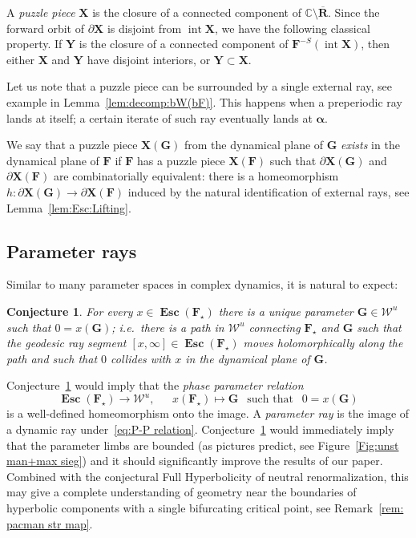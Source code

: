 \documentclass{amsart}
\renewcommand{\sp}{{\ \ }}
\newcommand{\1}{{\mathbb 1 }}
\newcommand\intr{\operatorname{int}}
\newcommand{\bF}{{\mathbf F}}
\newcommand{\bX}{{\mathbf X}}
\newcommand{\bY}{{\mathbf Y}}
\newcommand{\bR}{{\mathbf R}}
\newcommand{\bG}{{\mathbf G}}
\newcommand{\str}{{\star}}
\newcommand\Unst{{\boldsymbol{\mathcal{W}}^u}}
\newcommand{\C}{\mathbb{C}}
\newtheorem{conj}[thm]{Conjecture}
\theoremstyle{remark}
\numberwithin{equation}{section}
\theoremstyle{definition}
\newcommand{\Esc}{{\boldsymbol{\operatorname{Esc}}}}
\newcommand{\balpha}{{\boldsymbol \alpha}}
\theoremstyle{nonumberbreak}
\begin{document}
A \emph{puzzle piece} $\bX$ is the closure of a connected component of $\C\setminus \overline \bR$. Since the forward orbit of $\partial \bX$ is disjoint from $\intr \bX$, we have the following classical property. If $\bY$ is the closure of a connected component of $\bF^{-S}(\intr \bX)$, then either $\bX$ and $\bY$ have disjoint interiors, or $\bY\subset \bX$. 


Let us note that a puzzle piece can be surrounded by a single external ray, see example in Lemma~\ref{lem:decomp:bW(bF)}. This happens when a preperiodic ray lands at itself; a certain iterate of such ray eventually lands at $\balpha$.

We say that a puzzle piece $\bX(\bG)$ from the dynamical plane of $\bG$ \emph{exists} in the dynamical plane of $\bF$ if  $\bF$ has a puzzle piece $\bX(\bF)$ such that $\partial \bX(\bG)$ and $\partial \bX(\bF)$ are combinatorially equivalent: there is a homeomorphism $h\colon \partial \bX(\bG)\to \partial \bX(\bF)$ induced by the natural identification of external rays, see Lemma~\ref{lem:Esc:Lifting}.

\subsection{Parameter rays} \label{ss:param rays}Similar to many parameter spaces in complex dynamics, it is natural to expect:
\begin{conj}
\label{conj:P-P relation}
For every $x\in \Esc(\bF_\str)$ there is a unique parameter $\bG\in \Unst$ such that $0=x(\bG)$; i.e.~there is a path in $\Unst$ connecting $\bF_\str$ and $\bG$ such that the geodesic ray segment $[x,\infty]\in \Esc(\bF_\str)$ moves holomorphically along the path and such that $0$ collides with $x$ in the dynamical plane of $\bG$.
\end{conj}

Conjecture~\ref{conj:P-P relation} would imply that the \emph{phase parameter relation} 
\begin{equation}
\label{eq:P-P relation}
 \Esc(\bF_\str) \longrightarrow \Unst, \sp\sp\sp\ x(\bF_\str)\mapsto \bG \sp \text{ such that } \sp 0=x(\bG)
\end{equation}
is a well-defined homeomorphism onto the image. A \emph{parameter ray} is the image of a dynamic ray under~\eqref{eq:P-P relation}. Conjecture~\ref{conj:P-P relation} would immediately imply that the parameter limbs are bounded (as pictures predict, see Figure~\ref{Fig:unst man+max sieg}) and it should significantly improve the results of our paper. Combined with the conjectural Full Hyperbolicity of neutral renormalization, this may give a complete understanding of geometry near the boundaries of hyperbolic components with a single bifurcating critical point, see Remark~\ref{rem: pacman str map}.  
  
\end{document}

